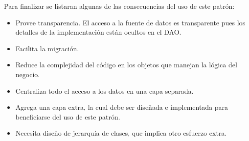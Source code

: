 Para finalizar se listaran algunas de las consecuencias del uso de este patrón:
\begin{itemize}
\item Provee transparencia. El acceso a la fuente de datos es transparente pues los detalles de la implementación están ocultos en el DAO. 
%
\item Facilita la migración.%
%
\item Reduce la complejidad del código en los objetos que manejan la lógica del negocio. %
%
\item Centraliza todo el acceso a los datos en una capa separada. %
%
\item Agrega una capa extra, la cual debe ser diseñada e implementada para beneficiarse del uso de este patrón. %
%
\item Necesita diseño de jerarquía de clases, que implica otro esfuerzo extra. %
%
\end{itemize}
%
%
